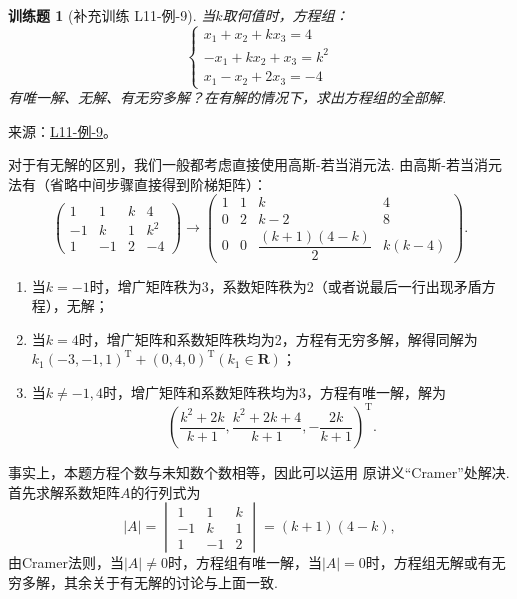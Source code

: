 \documentclass[12pt,fontset=fandol]{ctexart}
\newtheorem{exercise}{训练题}[section]
\begin{document}
\begin{exercise}[补充训练 L11-例-9]\label{prob:L11-例-9}
当$k$取何值时，方程组：
    \[\begin{cases}
            x_1+x_2+kx_3=4 \\ -x_1+kx_2+x_3=k^2 \\ x_1-x_2+2x_3=-4
        \end{cases}\]
    有唯一解、无解、有无穷多解？在有解的情况下，求出方程组的全部解.
\end{exercise}
\noindent 来源：\href{https://github.com/yhwu-is/Linear-Algebra-Left-Undone/blob/new/%E8%AE%B2%E4%B9%89/%E4%B8%93%E9%A2%98/11%20%E6%9C%9D%E8%8A%B1%E5%A4%95%E6%8B%BE.tex}{L11-例-9}。
\begin{solve}
对于有无解的区别，我们一般都考虑直接使用高斯-若当消元法. 由高斯-若当消元法有（省略中间步骤直接得到阶梯矩阵）：
    \[\begin{pmatrix}
            1  & 1  & k & 4   \\
            -1 & k  & 1 & k^2 \\
            1  & -1 & 2 & -4
        \end{pmatrix}\to\begin{pmatrix}
            1 & 1 & k                     & 4      \\
            0 & 2 & k-2                   & 8      \\
            0 & 0 & \dfrac{(k+1)(4-k)}{2} & k(k-4)
        \end{pmatrix}.\]
    \begin{enumerate}
        \item 当$k=-1$时，增广矩阵秩为3，系数矩阵秩为2（或者说最后一行出现矛盾方程），无解；

        \item 当$k=4$时，增广矩阵和系数矩阵秩均为2，方程有无穷多解，解得同解为$k_1(-3,-1,1)^{\mathrm{T}}+(0,4,0)^{\mathrm{T}}(k_1\in\mathbf{R})$；

        \item 当$k\neq-1,4$时，增广矩阵和系数矩阵秩均为3，方程有唯一解，解为
              \[(\dfrac{k^2+2k}{k+1},\dfrac{k^2+2k+4}{k+1},-\dfrac{2k}{k+1})^{\mathrm{T}}.\]
    \end{enumerate}

    事实上，本题方程个数与未知数个数相等，因此可以运用 原讲义“Cramer”处解决. 首先求解系数矩阵$A$的行列式为
    \[|A|=\begin{vmatrix}
            1  & 1  & k \\
            -1 & k  & 1 \\
            1  & -1 & 2
        \end{vmatrix}=(k+1)(4-k),\]
    由Cramer法则，当$|A|\neq 0$时，方程组有唯一解，当$|A|=0$时，方程组无解或有无穷多解，其余关于有无解的讨论与上面一致.
\end{solve}
\end{document}
